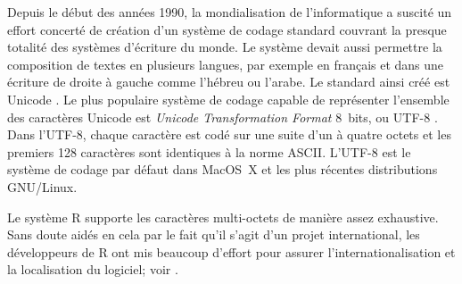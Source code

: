 \documentclass[letterpaper,11pt,english,french]{memoir}
\theoremstyle{plain}
\theoremstyle{definition}
\theoremstyle{remark}
\begin{document}
Depuis le début des années 1990, la mondialisation de l'informatique a
suscité un effort concerté de création d'un système de codage standard
couvrant la presque totalité des systèmes d'écriture du monde. Le
système devait aussi permettre la composition de textes en plusieurs
langues, par exemple en français et dans une écriture de droite à
gauche comme l'hébreu ou l'arabe. Le standard ainsi créé est Unicode
\citep{Unicode:5.0}. Le plus populaire système de codage capable de
représenter l'ensemble des caractères Unicode est \emph{Unicode
  Transformation Format} 8~bits, ou UTF-8 \citep[section
3.9]{Unicode:5.0}. Dans l'UTF-8, chaque caractère est codé sur une
suite d'un à quatre octets et les premiers 128 caractères sont
identiques à la norme ASCII. L'UTF-8 est le système de codage par
défaut dans MacOS~X et les plus récentes distributions GNU/Linux.

Le système R supporte les caractères multi-octets de manière assez
exhaustive. Sans doute aidés en cela par le fait qu'il s'agit d'un
projet international, les développeurs de R ont mis beaucoup d'effort
pour assurer l'internationalisation et la localisation du logiciel;
voir \cite{Ripley:Rnews:2005a}.

\end{document}
